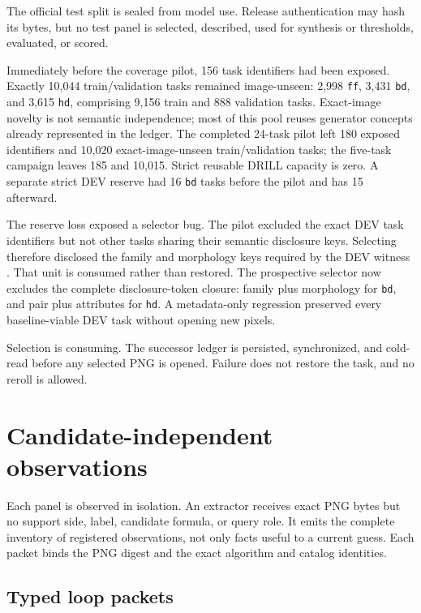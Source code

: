 \documentclass[11pt]{article}
\begin{document}
The official test split is sealed from model use.  Release authentication may
hash its bytes, but no test panel is selected, described, used for synthesis or
thresholds, evaluated, or scored.

Immediately before the coverage pilot, 156 task identifiers had been exposed.
Exactly 10,044 train/validation tasks remained image-unseen: 2,998
\texttt{ff}, 3,431 \texttt{bd}, and 3,615 \texttt{hd}, comprising 9,156 train
and 888 validation tasks.  Exact-image novelty is not semantic independence;
most of this pool reuses generator concepts already represented in the ledger.
The completed 24-task pilot left 180 exposed identifiers and 10,020
exact-image-unseen train/validation tasks; the five-task campaign leaves 185
and 10,015.  Strict reusable DRILL capacity is zero.  A separate strict DEV
reserve had 16 \texttt{bd} tasks before the pilot and has 15 afterward.

The reserve loss exposed a selector bug.  The pilot excluded the exact DEV
task identifiers but not other tasks sharing their semantic disclosure keys.
Selecting
therefore disclosed the family and morphology keys required by the DEV witness
.  That unit is consumed rather than
restored.  The prospective selector now excludes the complete disclosure-token
closure: family plus morphology for \texttt{bd}, and pair plus attributes for
\texttt{hd}.  A metadata-only regression preserved every baseline-viable DEV
task without opening new pixels.

Selection is consuming.  The successor ledger is persisted, synchronized, and
cold-read before any selected PNG is opened.  Failure does not restore the
task, and no reroll is allowed.

\section{Candidate-independent observations}

Each panel is observed in isolation.  An extractor receives exact PNG bytes
but no support side, label, candidate formula, or query role.  It emits the
complete inventory of registered observations, not only facts useful to a
current guess.  Each packet binds the PNG digest and the exact algorithm and
catalog identities.

\subsection{Typed loop packets}
\end{document}
